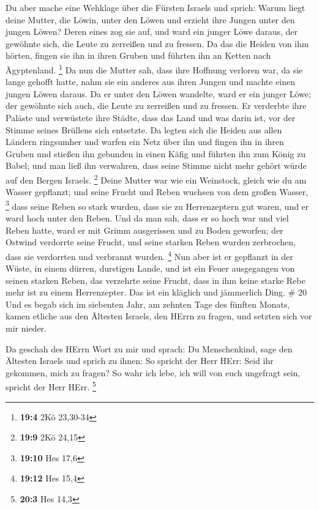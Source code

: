  Du aber mache eine Wehklage über die Fürsten Israels
 und sprich: Warum liegt deine Mutter, die Löwin, unter den
Löwen und erzieht ihre Jungen unter den jungen Löwen?  Deren
eines zog sie auf, und ward ein junger Löwe daraus, der gewöhnte sich,
die Leute zu zerreißen und zu fressen.  Da das die Heiden
von ihm hörten, fingen sie ihn in ihren Gruben und führten ihn an Ketten
nach Ägyptenland. \footnote{\textbf{19:4} 2Kö 23,30-34}  Da
nun die Mutter sah, dass ihre Hoffnung verloren war, da sie lange
gehofft hatte, nahm sie ein anderes aus ihren Jungen und machte einen
jungen Löwen daraus.  Da er unter den Löwen wandelte, ward
er ein junger Löwe; der gewöhnte sich auch, die Leute zu zerreißen und
zu fressen.  Er verderbte ihre Paläste und verwüstete ihre
Städte, dass das Land und was darin ist, vor der Stimme seines Brüllens
sich entsetzte.  Da legten sich die Heiden aus allen Ländern
ringsumher und warfen ein Netz über ihn und fingen ihn in ihren Gruben
 und stießen ihn gebunden in einen Käfig und führten ihn zum
König zu Babel; und man ließ ihn verwahren, dass seine Stimme nicht mehr
gehört würde auf den Bergen Israels. \footnote{\textbf{19:9} 2Kö 24,15}
 Deine Mutter war wie ein Weinstock, gleich wie du am
Wasser gepflanzt; und seine Frucht und Reben wuchsen von dem großen
Wasser, \footnote{\textbf{19:10} Hes 17,6}  dass seine
Reben so stark wurden, dass sie zu Herrenzeptern gut waren, und er ward
hoch unter den Reben. Und da man sah, dass er so hoch war und viel Reben
hatte,  ward er mit Grimm ausgerissen und zu Boden
geworfen; der Ostwind verdorrte seine Frucht, und seine starken Reben
wurden zerbrochen, dass sie verdorrten und verbrannt wurden. \footnote{\textbf{19:12}
  Hes 15,4}  Nun aber ist er gepflanzt in der Wüste, in
einem dürren, durstigen Lande,  und ist ein Feuer
ausgegangen von seinen starken Reben, das verzehrte seine Frucht, dass
in ihm keine starke Rebe mehr ist zu einem Herrenzepter. Das ist ein
kläglich und jämmerlich Ding. \# 20  Und es begab sich im
siebenten Jahr, am zehnten Tage des fünften Monats, kamen etliche aus
den Ältesten Israels, den HErrn zu fragen, und setzten sich vor mir
nieder.

 Da geschah des HErrn Wort zu mir und sprach: 
Du Menschenkind, sage den Ältesten Israels und sprich zu ihnen: So
spricht der Herr HErr: Seid ihr gekommen, mich zu fragen? So wahr ich
lebe, ich will von euch ungefragt sein, spricht der Herr HErr.
\footnote{\textbf{20:3} Hes 14,3}

